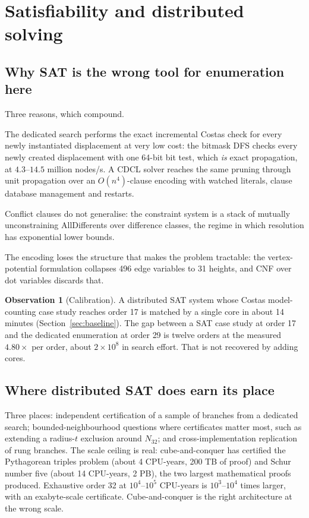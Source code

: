 \documentclass[11pt,a4paper]{article}
\theoremstyle{definition}
\newtheorem{observation}[theorem]{Observation}
\begin{document}
\section{Satisfiability and distributed solving}
\label{sec:sat}

\subsection{Why SAT is the wrong tool for enumeration here}

Three reasons, which compound.

The dedicated search performs the exact incremental Costas check for every
newly instantiated displacement at very low cost: the bitmask DFS checks
every newly created displacement with one 64-bit bit test, which \emph{is} exact
propagation, at $4.3$--$14.5$ million nodes/s. A CDCL solver reaches the same
pruning through unit propagation over an $O(n^4)$-clause encoding with watched
literals, clause database management and restarts.

Conflict clauses do not generalise: the constraint system is a stack of mutually
unconstraining AllDifferents over difference classes, the regime in which
resolution has exponential lower bounds.

The encoding loses the structure that makes the problem tractable: the
vertex-potential formulation collapses 496 edge variables to 31 heights, and CNF
over dot variables discards that.

\begin{observation}[Calibration]
A distributed SAT system whose Costas model-counting case study reaches order 17
is matched by a single core in about 14 minutes (Section~\ref{sec:baseline}). The
gap between a SAT case study at order 17 and the dedicated enumeration at order
29 is twelve orders at the measured $4.80\times$ per order, about
$2\times10^{8}$ in search effort. That is not recovered by adding cores.
\end{observation}

\subsection{Where distributed SAT does earn its place}

Three places: independent certification of a sample of branches from a dedicated
search; bounded-neighbourhood questions where certificates matter most, such as
extending a radius-$t$ exclusion around $N_{32}$; and cross-implementation
replication of rung branches. The scale ceiling is real: cube-and-conquer has
certified the Pythagorean triples problem (about 4 CPU-years, 200 TB of proof)
and Schur number five (about 14 CPU-years, 2 PB), the two largest mathematical
proofs produced. Exhaustive order 32 at $10^4$--$10^5$ CPU-years is
$10^3$--$10^4$ times larger, with an exabyte-scale certificate. Cube-and-conquer
is the right architecture at the wrong scale.
\end{document}

